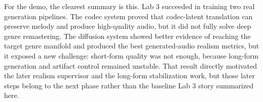 \documentclass[11pt]{article}
\begin{document}
For the demo, the clearest summary is this. Lab 3 succeeded in training two real generation pipelines. The codec system proved that codec-latent translation can preserve melody and produce high-quality audio, but it did not fully solve deep genre remastering. The diffusion system showed better evidence of reaching the target genre manifold and produced the best generated-audio realism metrics, but it exposed a new challenge: short-form quality was not enough, because long-form generation and artifact control remained unstable. That result directly motivated the later realism supervisor and the long-form stabilization work, but those later steps belong to the next phase rather than the baseline Lab 3 story summarized here.
\end{document}

